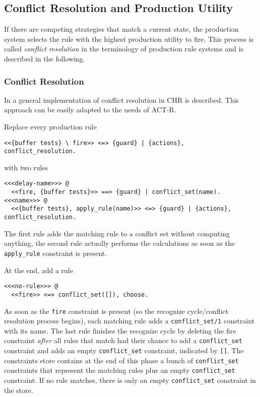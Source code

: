 \subsection{Conflict Resolution and Production Utility}

If there are competing strategies that match a current state, the production system selects the rule with the highest production utility to fire. This process is called \emph{conflict resolution} in the terminology of production rule systems and is described in the following.

\subsubsection{Conflict Resolution}
\label{implementation:conflict_resolution}

In \cite[151\psqq]{fru_chr_book_2009} a general implementation of conflict resolution in CHR is described. This approach can be easily adapted to the needs of ACT-R.

Replace every production rule

\begin{lstlisting}
<<{buffer tests} \ fire>> <=> {guard} | {actions}, conflict_resolution.
\end{lstlisting}

with two rules

\begin{lstlisting}[caption={Translation scheme for production rules regarding conflict resolution}, label=lst:conflict_resolution_scheme]
<<<delay-name>>> @
  <<fire, {buffer tests}>> ==> {guard} | conflict_set(name).
<<<name>>> @
  <<{buffer tests}, apply_rule(name)>> <=> {guard} | {actions}, conflict_resolution.
\end{lstlisting}

The first rule adds the matching rule to a conflict set without computing anything, the second rule actually performs the calculations as soon as the \lstinline|apply_rule| constraint is present.

At the end, add a rule

\begin{lstlisting}
<<<no-rule>>> @
  <<fire>> <=> conflict_set([]), choose.
\end{lstlisting}

As soon as the \lstinline|fire| constraint is present (so the recognize cycle/conflict resolution process begins), each matching rule adds a \lstinline|conflict_set/1| constraint with its name. The last rule finishes the recognize cycle by deleting the fire constraint \emph{after} all rules that match had their chance to add a \lstinline|conflict_set| constraint and adds an empty \lstinline|conflict_set| constraint, indicated by \lstinline|[]|. The constraints store contains at the end of this phase a bunch of \lstinline|conflict_set| constraints that represent the matching rules plus an empty \lstinline|conflict_set| constraint. If no rule matches, there is only an empty \lstinline|conflict_set| constraint in the store.

